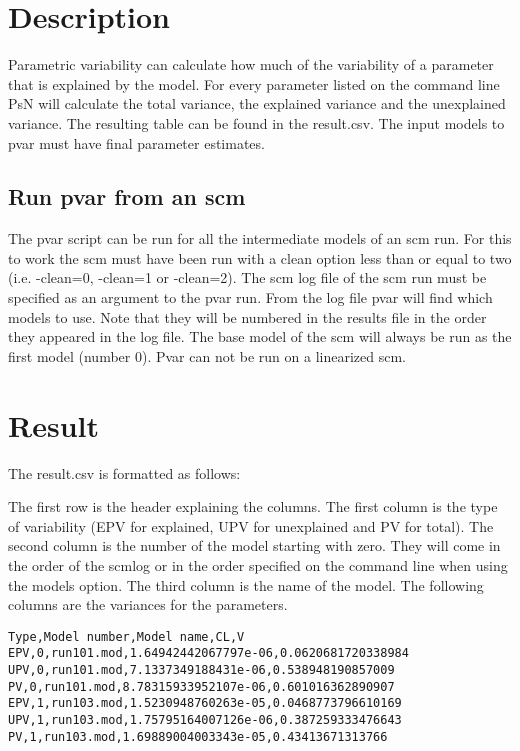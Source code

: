 \section{Description}

Parametric variability can calculate how much of the variability of a parameter that is explained by the model. For every parameter listed on the command line PsN will calculate the total variance, the explained variance and the unexplained variance. The resulting table can be found in the result.csv. The input models to pvar must have final parameter estimates.

\subsection{Run pvar from an scm}
The pvar script can be run for all the intermediate models of an scm run. For this to work the scm must have been run with a clean option less than or equal to two (i.e. -clean=0, -clean=1 or -clean=2). The scm log file of the scm run must be specified as an argument to the pvar run. From the log file pvar will find which models to use. Note that they will be numbered in the results file in the order they appeared in the log file. The base model of the scm will always be run as the first model (number 0). Pvar can not be run on a linearized scm. 

\section{Result}

The result.csv is formatted as follows:

The first row is the header explaining the columns.
The first column is the type of variability (EPV for explained, UPV for unexplained and PV for total). The second column is the number of the model starting with zero. They will come in the order of the scmlog or in the order specified on the command line when using the models option. The third column is the name of the model. The following columns are the variances for the parameters.

\begin{verbatim}
Type,Model number,Model name,CL,V
EPV,0,run101.mod,1.64942442067797e-06,0.0620681720338984
UPV,0,run101.mod,7.1337349188431e-06,0.538948190857009
PV,0,run101.mod,8.78315933952107e-06,0.601016362890907
EPV,1,run103.mod,1.5230948760263e-05,0.0468773796610169
UPV,1,run103.mod,1.75795164007126e-06,0.387259333476643
PV,1,run103.mod,1.69889004003343e-05,0.43413671313766
\end{verbatim}

